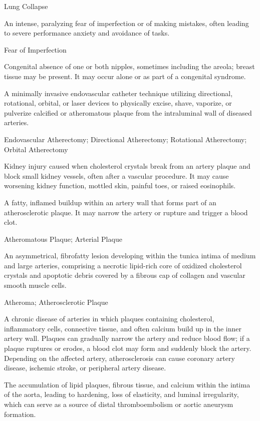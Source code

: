 \synonyms
Lung Collapse

 An intense, paralyzing fear of imperfection or of making mistakes, often leading to severe performance anxiety and avoidance of tasks.

\synonyms
Fear of Imperfection

 Congenital absence of one or both nipples, sometimes including the areola; breast tissue may be present. It may occur alone or as part of a congenital syndrome.

 A minimally invasive endovascular catheter technique utilizing directional, rotational, orbital, or laser devices to physically excise, shave, vaporize, or pulverize calcified or atheromatous plaque from the intraluminal wall of diseased arteries.

\synonyms
Endovascular Atherectomy; Directional Atherectomy; Rotational Atherectomy; Orbital Atherectomy

 Kidney injury caused when cholesterol crystals break from an artery plaque and block small kidney vessels, often after a vascular procedure. It may cause worsening kidney function, mottled skin, painful toes, or raised eosinophils.

 A fatty, inflamed buildup within an artery wall that forms part of an atherosclerotic plaque. It may narrow the artery or rupture and trigger a blood clot.

\synonyms
Atheromatous Plaque; Arterial Plaque

 An asymmetrical, fibrofatty lesion developing within the tunica intima of medium and large arteries, comprising a necrotic lipid-rich core of oxidized cholesterol crystals and apoptotic debris covered by a fibrous cap of collagen and vascular smooth muscle cells.

\synonyms
Atheroma; Atherosclerotic Plaque

 A chronic disease of arteries in which plaques containing cholesterol, inflammatory cells, connective tissue, and often calcium build up in the inner artery wall. Plaques can gradually narrow the artery and reduce blood flow; if a plaque ruptures or erodes, a blood clot may form and suddenly block the artery. Depending on the affected artery, atherosclerosis can cause coronary artery disease, ischemic stroke, or peripheral artery disease.

 The accumulation of lipid plaques, fibrous tissue, and calcium within the intima of the aorta, leading to hardening, loss of elasticity, and luminal irregularity, which can serve as a source of distal thromboembolism or aortic aneurysm formation.

